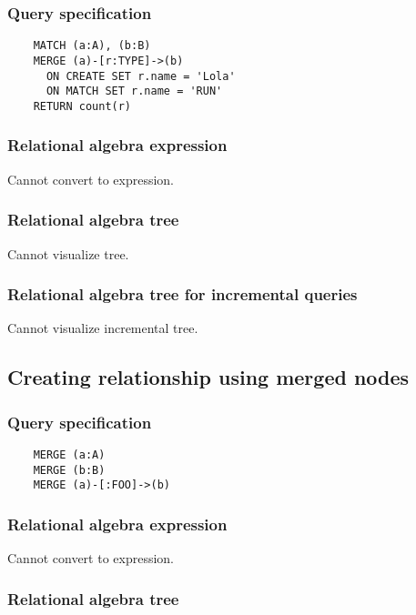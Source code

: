 	\subsubsection*{Query specification}

	\begin{lstlisting}
	MATCH (a:A), (b:B)
	MERGE (a)-[r:TYPE]->(b)
	  ON CREATE SET r.name = 'Lola'
	  ON MATCH SET r.name = 'RUN'
	RETURN count(r)
	\end{lstlisting}


	\subsubsection*{Relational algebra expression}

	Cannot convert to expression.

	\subsubsection*{Relational algebra tree}

	Cannot visualize tree.

	\subsubsection*{Relational algebra tree for incremental queries}

	Cannot visualize incremental tree.
	\subsection{Creating relationship using merged nodes}

	\subsubsection*{Query specification}

	\begin{lstlisting}
	MERGE (a:A)
	MERGE (b:B)
	MERGE (a)-[:FOO]->(b)
	\end{lstlisting}


	\subsubsection*{Relational algebra expression}

	Cannot convert to expression.

	\subsubsection*{Relational algebra tree}

